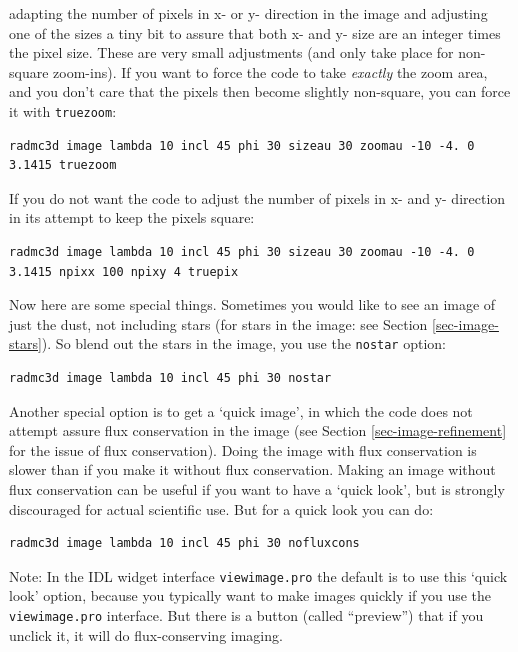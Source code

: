 \documentclass{report}
\newenvironment{asciibox}%
  {\begin{list}{}{%
    \setlength{\topsep}{0.5em}%
    \setlength{\parskip}{0em}%
    \setlength{\parsep}{0em}%
    \setlength{\itemsep}{0em}%
    \setlength{\rightmargin}{0em}%
    \setlength{\leftmargin}{3.0em}%
    \setlength{\labelsep}{1em}%
    \setlength{\labelwidth}{2em}%
  }\normalfont\footnotesize\item}
  {\end{list}}
\begin{document}
adapting the number of pixels in x- or y- direction in the image and
adjusting one of the sizes a tiny bit to assure that both x- and y- size are
an integer times the pixel size. These are very small adjustments (and only
take place for non-square zoom-ins).  If you want to force the code to take
{\em exactly} the zoom area, and you don't care that the pixels then become
slightly non-square, you can force it with {\small\tt truezoom}:
\begin{asciibox}\begin{verbatim}
radmc3d image lambda 10 incl 45 phi 30 sizeau 30 zoomau -10 -4. 0 3.1415 truezoom
\end{verbatim}\end{asciibox}
If you do not want the code to adjust the number of pixels in x- and y-
direction in its attempt to keep the pixels square:
\begin{asciibox}\begin{verbatim}
radmc3d image lambda 10 incl 45 phi 30 sizeau 30 zoomau -10 -4. 0 3.1415 npixx 100 npixy 4 truepix
\end{verbatim}\end{asciibox}

Now here are some special things. Sometimes you would like to see an image
of just the dust, not including stars (for stars in the image: see Section
\ref{sec-image-stars}). So blend out the stars in the image, you use the
{\small\tt nostar} option:
\begin{asciibox}\begin{verbatim}
radmc3d image lambda 10 incl 45 phi 30 nostar
\end{verbatim}\end{asciibox}

Another special option is to get a `quick image', in which the code does not
attempt assure flux conservation in the image (see Section
\ref{sec-image-refinement} for the issue of flux conservation). Doing the
image with flux conservation is slower than if you make it without flux
conservation. Making an image without flux conservation can be useful if you
want to have a `quick look', but is strongly discouraged for actual
scientific use. But for a quick look you can do:
\begin{asciibox}\begin{verbatim}
radmc3d image lambda 10 incl 45 phi 30 nofluxcons
\end{verbatim}\end{asciibox}
Note: In the IDL widget interface {\small\tt viewimage.pro} the default
is to use this `quick look' option, because you typically want to make
images quickly if you use the {\small\tt viewimage.pro} interface. But
there is a button (called ``preview'') that if you unclick it, it will
do flux-conserving imaging. 
\end{document}
